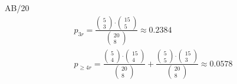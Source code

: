 \begin{exercise}{AB/20}
  \begin{gather*}
    p_{3r} = \frac{\begin{pmatrix}5 \\ 3\end{pmatrix} \cdot \begin{pmatrix}15 \\ 5\end{pmatrix}}{\begin{pmatrix}20 \\ 8\end{pmatrix}} \approx 0.2384 \\
    p_{\geq 4r} = \frac{\begin{pmatrix}5 \\ 4\end{pmatrix} \cdot \begin{pmatrix}15 \\ 4\end{pmatrix}}{\begin{pmatrix}20 \\ 8\end{pmatrix}} + \frac{\begin{pmatrix}5 \\ 5\end{pmatrix} \cdot \begin{pmatrix}15 \\ 3\end{pmatrix}}{\begin{pmatrix}20 \\ 8\end{pmatrix}} \approx 0.0578
  \end{gather*}
\end{exercise}
